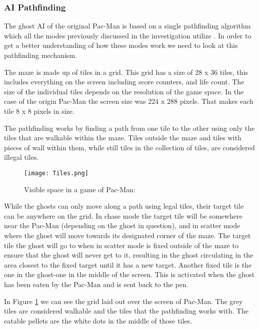 
\subsubsection{AI Pathfinding}
The ghost AI of the original Pac-Man is based on a single pathfinding algorithm which all the modes previously discussed in the investigation utilize \cite{Pittman2011}.
In order to get a better understanding of how these modes work we need to look at this pathfinding mechanism.

The maze is made up of tiles in a grid.
This grid has a size of 28 x 36 tiles, this includes everything on the screen including score counters, and life count.
The size of the individual tiles depends on the resolution of the game space.
In the case of the origin Pac-Man the screen size was 224 x 288 pixels.
That makes each tile 8 x 8 pixels in size.

The pathfinding works by finding a path from one tile to the other using only the tiles that are walkable within the maze.
Tiles outside the maze and tiles with pieces of wall within them, while still tiles in the collection of tiles, are considered illegal tiles.

\begin{figure}[!htbp]
\centering
\texttt{[image: Tiles.png]}
\caption{Visible space in a game of Pac-Man: \cite{Pittman2011} }
\label{fig:Pacman_visible_space}
\end{figure}

While the ghosts can only move along a path using legal tiles, their target tile can be anywhere on the grid.
In chase mode the target tile will be somewhere near the Pac-Man (depending on the ghost in question), and in scatter mode where the ghost will move towards its designated corner of the maze.
The target tile the ghost will go to when in scatter mode is fixed outside of the maze to ensure that the ghost will never get to it, resulting in the ghost circulating in the area closest to the fixed target until it has a new target.
Another fixed tile is the one in the ghost-one in the middle of the screen.
This is activated when the ghost has been eaten by the Pac-Man and is sent back to the pen.

In Figure \ref{fig:Pacman_visible_space} we can see the grid laid out over the screen of Pac-Man. The grey tiles are considered walkable and the tiles that the pathfinding works with. The eatable pellets are the white dots in the middle of those tiles.

